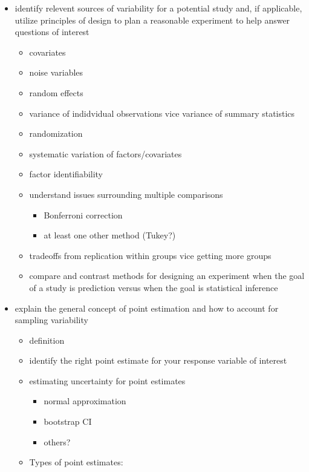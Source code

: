 \documentclass[
]{book}
\providecommand{\tightlist}{%
  \setlength{\itemsep}{0pt}\setlength{\parskip}{0pt}}
\theoremstyle{definition}
\theoremstyle{definition}
\theoremstyle{definition}
\theoremstyle{remark}
\begin{document}
\begin{itemize}
\item
  identify relevent sources of variability for a potential study and, if applicable, utilize principles of design to plan a reasonable experiment to help answer questions of interest

  \begin{itemize}
  \tightlist
  \item
    covariates
  \item
    noise variables
  \item
    random effects
  \item
    variance of indidvidual observations vice variance of summary statistics
  \item
    randomization
  \item
    systematic variation of factors/covariates
  \item
    factor identifiability
  \item
    understand issues surrounding multiple comparisons

    \begin{itemize}
    \tightlist
    \item
      Bonferroni correction
    \item
      at least one other method (Tukey?)
    \end{itemize}
  \item
    tradeoffs from replication within groups vice getting more groups
  \item
    compare and contrast methods for designing an experiment when the goal of a study is prediction versus when the goal is statistical inference
  \end{itemize}
\item
  explain the general concept of point estimation and how to account for sampling variability

  \begin{itemize}
  \tightlist
  \item
    definition
  \item
    identify the right point estimate for your response variable of interest
  \item
    estimating uncertainty for point estimates

    \begin{itemize}
    \tightlist
    \item
      normal approximation
    \item
      bootstrap CI
    \item
      others?
    \end{itemize}
  \item
    Types of point estimates:


\end{itemize}
\end{itemize}
\end{document}
